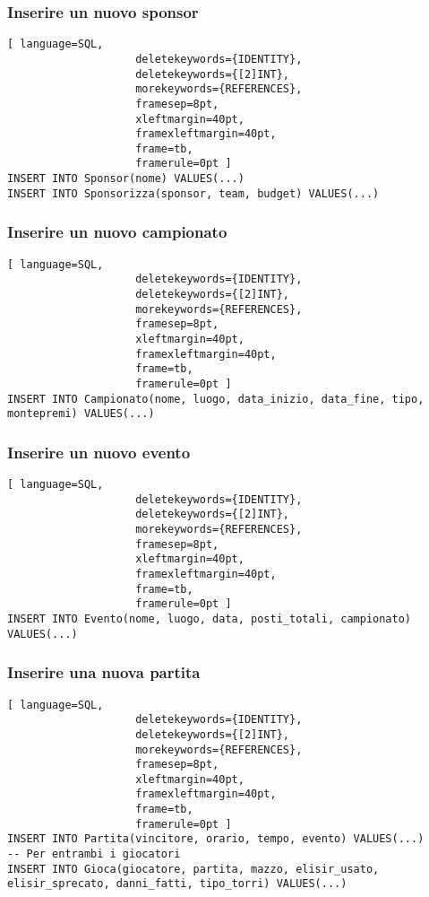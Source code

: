 \documentclass{article}
\begin{document}
\subsubsection{Inserire un nuovo sponsor}
\begin{lstlisting}[ language=SQL,
                    deletekeywords={IDENTITY},
                    deletekeywords={[2]INT},
                    morekeywords={REFERENCES},
                    framesep=8pt,
                    xleftmargin=40pt,
                    framexleftmargin=40pt,
                    frame=tb,
                    framerule=0pt ]
INSERT INTO Sponsor(nome) VALUES(...)
INSERT INTO Sponsorizza(sponsor, team, budget) VALUES(...)
\end{lstlisting}

\subsubsection{Inserire un nuovo campionato}
\begin{lstlisting}[ language=SQL,
                    deletekeywords={IDENTITY},
                    deletekeywords={[2]INT},
                    morekeywords={REFERENCES},
                    framesep=8pt,
                    xleftmargin=40pt,
                    framexleftmargin=40pt,
                    frame=tb,
                    framerule=0pt ]
INSERT INTO Campionato(nome, luogo, data_inizio, data_fine, tipo, montepremi) VALUES(...)
\end{lstlisting}

\subsubsection{Inserire un nuovo evento}
\begin{lstlisting}[ language=SQL,
                    deletekeywords={IDENTITY},
                    deletekeywords={[2]INT},
                    morekeywords={REFERENCES},
                    framesep=8pt,
                    xleftmargin=40pt,
                    framexleftmargin=40pt,
                    frame=tb,
                    framerule=0pt ]
INSERT INTO Evento(nome, luogo, data, posti_totali, campionato) VALUES(...)
\end{lstlisting}

\subsubsection{Inserire una nuova partita}
\begin{lstlisting}[ language=SQL,
                    deletekeywords={IDENTITY},
                    deletekeywords={[2]INT},
                    morekeywords={REFERENCES},
                    framesep=8pt,
                    xleftmargin=40pt,
                    framexleftmargin=40pt,
                    frame=tb,
                    framerule=0pt ]
INSERT INTO Partita(vincitore, orario, tempo, evento) VALUES(...)
-- Per entrambi i giocatori
INSERT INTO Gioca(giocatore, partita, mazzo, elisir_usato, elisir_sprecato, danni_fatti, tipo_torri) VALUES(...)
\end{lstlisting}
\end{document}

